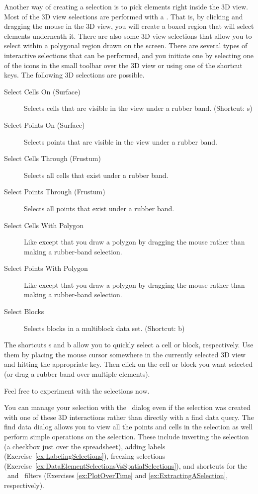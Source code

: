 Another way of creating a selection is to pick elements right
inside the 3D view.  Most of the 3D view selections are performed with a
.  That is, by clicking and dragging the
mouse in the 3D view, you will create a boxed region that will select
elements underneath it.  There are also some 3D view selections that allow
you to select within a polygonal region drawn on the screen.  There are
several types of interactive selections that can be performed, and you
initiate one by selecting one of the icons in the small toolbar over the 3D
view or using one of the shortcut keys.  The following 3D selections are
possible.

\begin{description}
\item[\selectCellsOn Select Cells On (Surface)] Selects cells that are
  visible in the view under a rubber band.  (Shortcut: s)
\item[\selectPointsOn Select Points On (Surface)] Selects points that are
  visible in the view under a rubber band.
\item[\selectCellsThrough Select Cells Through (Frustum)] Selects all cells
  that exist under a rubber band.
\item[\selectPointsThrough Select Points Through (Frustum)] Selects all
  points that exist under a rubber band.
\item[\selectCellsPolygon Select Cells With Polygon] Like  except that you draw a polygon by dragging the mouse rather than
  making a rubber-band selection.
\item[\selectPointsPolygon Select Points With Polygon] Like  except that you draw a polygon by dragging the mouse rather
  than making a rubber-band selection.
\item[\selectBlocks Select Blocks] Selects blocks in a
  multiblock data set.  (Shortcut: b)
\end{description}

The shortcuts s and b allow you to quickly select a cell or block,
respectively.  Use them by placing the mouse cursor somewhere in the
currently selected 3D view and hitting the appropriate key.  Then click on
the cell or block you want selected (or drag a rubber band over multiple
elements).

Feel free to experiment with the selections now.

You can manage your selection with the ~\findData dialog
even if the selection was created with one of these 3D interactions rather
than directly with a find data query. The find data dialog allows you to
view all the points and cells in the selection as well perform simple
operations on the selection. These include inverting the selection (a
checkbox just over the spreadsheet), adding labels
(Exercise~\ref{ex:LabelingSelections}), freezing selections
(Exercise~\ref{ex:DataElementSelectionsVsSpatialSelections}), and shortcuts
for the ~\plotSelectionOverTime and
~\extractSelection filters (Exercises
\ref{ex:PlotOverTime} and \ref{ex:ExtractingASelection}, respectively).

